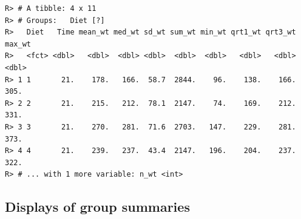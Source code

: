 \documentclass[english,10pt,a4paper,oneside]{book}
\newenvironment{Shaded}{\begin{snugshade}}{\end{snugshade}}
\newcommand{\DataTypeTok}[1]{\textcolor[rgb]{0.13,0.29,0.53}{#1}}
\newcommand{\DecValTok}[1]{\textcolor[rgb]{0.00,0.00,0.81}{#1}}
\newcommand{\FloatTok}[1]{\textcolor[rgb]{0.00,0.00,0.81}{#1}}
\newcommand{\KeywordTok}[1]{\textcolor[rgb]{0.13,0.29,0.53}{\textbf{#1}}}
\newcommand{\NormalTok}[1]{#1}
\newcommand{\OperatorTok}[1]{\textcolor[rgb]{0.81,0.36,0.00}{\textbf{#1}}}
\newcommand{\OtherTok}[1]{\textcolor[rgb]{0.56,0.35,0.01}{#1}}
\newcommand{\StringTok}[1]{\textcolor[rgb]{0.31,0.60,0.02}{#1}}
\theoremstyle{definition}
\theoremstyle{definition}
\theoremstyle{definition}
\theoremstyle{remark}
\begin{document}
\begin{Shaded}
\end{Shaded}

\begin{verbatim}
R> # A tibble: 4 x 11
R> # Groups:   Diet [?]
R>   Diet   Time mean_wt med_wt sd_wt sum_wt min_wt qrt1_wt qrt3_wt max_wt
R>   <fct> <dbl>   <dbl>  <dbl> <dbl>  <dbl>  <dbl>   <dbl>   <dbl>  <dbl>
R> 1 1       21.    178.   166.  58.7  2844.    96.    138.    166.   305.
R> 2 2       21.    215.   212.  78.1  2147.    74.    169.    212.   331.
R> 3 3       21.    270.   281.  71.6  2703.   147.    229.    281.   373.
R> 4 4       21.    239.   237.  43.4  2147.   196.    204.    237.   322.
R> # ... with 1 more variable: n_wt <int>
\end{verbatim}

\hypertarget{displays-of-group-summaries}{%
\subsection{Displays of group
summaries}\label{displays-of-group-summaries}}
\end{document}
